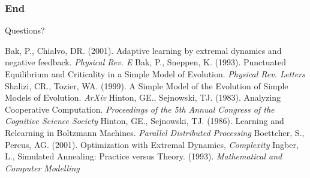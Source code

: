 \documentclass{beamer}
\begin{document}
\begin{frame}
  \frametitle{End}
  Questions?
\end{frame}
\begin{frame}
  \begin{thebibliography}{99}
      Bak, P., Chialvo, DR. (2001). Adaptive learning by extremal dynamics and negative feedback. \emph{Physical Rev. E}
      Bak, P., Sneppen, K. (1993). Punctuated Equilibrium and Criticality in a Simple Model of Evolution. \emph{Physical Rev. Letters}
      Shalizi, CR., Tozier, WA. (1999). A Simple Model of the Evolution of Simple Models of Evolution. \emph{ArXiv}
      Hinton, GE., Sejnowski, TJ. (1983). Analyzing Cooperative Computation. \emph{Proceedings of the 5th Annual Congress of the Cognitive Science Society}
      Hinton, GE., Sejnowski, TJ. (1986). Learning and Relearning in Boltzmann Machines. \emph{Parallel Distributed Processing}
      Boettcher, S., Percus, AG. (2001). Optimization with Extremal Dynamics, \emph{Complexity}
      Ingber, L., Simulated Annealing: Practice versus Theory. (1993). \emph{Mathematical and Computer Modelling}
  \end{thebibliography}

\end{frame}
\end{document}
